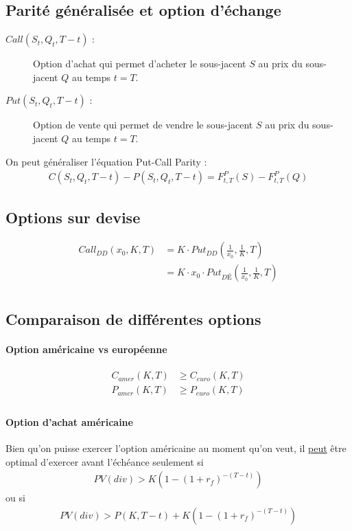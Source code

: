\documentclass[10pt, french]{article}
\begin{document}
\begin{multicols*}{2}
\subsection*{Parité généralisée et option d'échange}
\begin{description}
\item[$Call(S_t, Q_t, T - t)$ : ] Option d'achat qui permet d'acheter le sous-jacent $S$ au prix du sous-jacent $Q$ au temps $t = T$.
\item[$Put(S_t, Q_t, T - t)$ : ] Option de vente qui permet de vendre le sous-jacent $S$ au prix du sous-jacent $Q$ au temps $t = T$.
\end{description}
On peut généraliser l'équation Put-Call Parity :
\begin{align*}
C(S_t, Q_t, T - t) - P(S_t, Q_t, T-t) = F_{t,T}^{P}(S) - F_{t,T}^{P}(Q)
\end{align*}

\subsection*{Options sur devise}
\begin{align*}
Call_{DD}(x_0, K, T) & = K \cdot Put_{DD}\left( \frac{1}{x_0}, \frac{1}{K}, T \right) \\
& = K \cdot x_0 \cdot Put_{DÉ} \left( \frac{1}{x_0}, \frac{1}{K}, T \right) \\
\end{align*}


\subsection*{Comparaison de différentes options}
\paragraph{Option américaine vs européenne}
\begin{align*}
C_{amer}(K,T) & \geq C_{euro}(K,T) \\
P_{amer}(K,T) & \geq P_{euro}(K,T) \\
\end{align*}

\paragraph{Option d'achat américaine}
Bien qu'on puisse exercer l'option américaine au moment qu'on veut, il \underline{peut} être optimal d'exercer avant l'échéance seulement si
\begin{align*}
PV(div) > K \left(1 - (1+r_f)^{-(T-t)} \right)
\end{align*}
ou si
\begin{align*}
PV(div) > P(K, T-t) + K \left(1 - (1+r_f)^{-(T-t)} \right)
\end{align*}


\end{multicols*}
\end{document}
